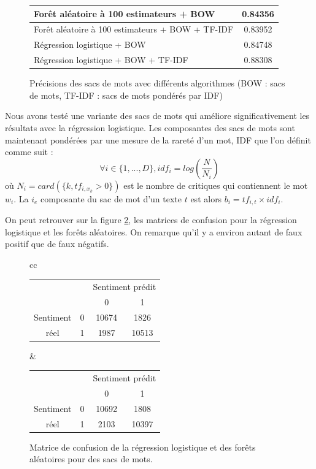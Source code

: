 \documentclass{article}
\begin{document}
\begin{figure}[h]
\begin{center}
\begin{tabular}{|l|c|}
	\hline
	Forêt aléatoire à 100 estimateurs + BOW & 0.84356 \\
	\hline
	Forêt aléatoire à 100 estimateurs + BOW + TF-IDF & 0.83952 \\
	\hline
	Régression logistique + BOW & 0.84748 \\
	\hline
	Régression logistique + BOW + TF-IDF & 0.88308 \\
	\hline
\end{tabular}
\caption{Précisions des sacs de mots avec différents algorithmes (BOW : sacs de mots, TF-IDF : sacs de mots pondérés par IDF)}
\label{results_bow}
\end{center}
\end{figure}

Nous avons testé une variante des sacs de mots qui améliore significativement les résultats avec la régression logistique. Les composantes des sacs de mots sont maintenant pondérées par une mesure de la rareté d'un mot, IDF \cite{Salton:1986:IMI:576628} que l'on définit comme suit :
$$
\forall i \in \{1, ..., D\}, idf_{i} = log(\frac{N}{N_{i}})
$$
où $N_{i} = card(\{k, tf_{i, x_{k}} > 0\})$ est le nombre de critiques qui contiennent le mot $w_{i}$. La $i_{e}$ composante du sac de mot d'un texte $t$ est alors $b_{i} = tf_{i,t} \times idf_{i}$. 

On peut retrouver sur la figure \ref{confusion_matrices_bow}, les matrices de confusion pour la régression logistique et les forêts aléatoires. On remarque qu'il y a environ autant de faux positif que de faux négatifs.

\begin{figure}[h]
\begin{center}
\begin{tabular}{cc}
\begin{tabular}{|c|c|c|c|}
   \hline
   \multicolumn{2}{|c|}{} & \multicolumn{2}{c|}{Sentiment prédit} \\
   \cline{3-4}
   \multicolumn{2}{|c|}{} & 0     & 1 \\
   \hline
   Sentiment          & 0 & 10674 & 1826 \\
   \cline{2-4}
   réel               & 1 & 1987  & 10513 \\
   \hline
\end{tabular} &
\begin{tabular}{|c|c|c|c|}
   \hline
   \multicolumn{2}{|c|}{} & \multicolumn{2}{c|}{Sentiment prédit} \\
   \cline{3-4}
   \multicolumn{2}{|c|}{} & 0     & 1 \\
   \hline
   Sentiment          & 0 & 10692 & 1808 \\
   \cline{2-4}
   réel               & 1 & 2103  & 10397 \\
   \hline
\end{tabular}
\end{tabular}
\end{center}
\caption{Matrice de confusion de la régression logistique et des forêts aléatoires pour des sacs de mots.}
\label{confusion_matrices_bow}
\end{figure}
\end{document}
